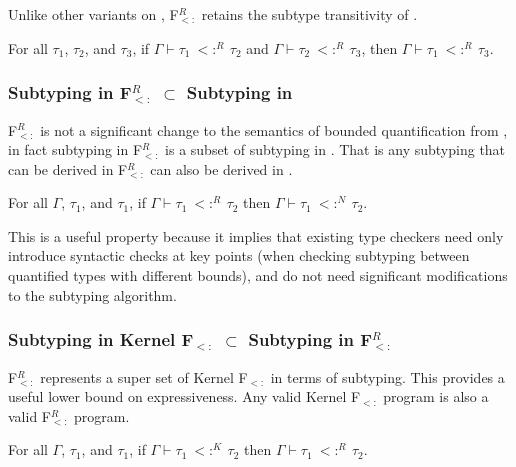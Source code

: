 \documentclass[runningheads]{llncs}
\begin{document}
Unlike other variants on \Fsub \cite{strong kernel sub}, F$_{<:}^R$ retains the subtype transitivity of
\Fsub.

\begin{theorem}
For all $\tau_1$, $\tau_2$, and $\tau_3$, if $\Gamma \vdash \tau_1\ <:^R\ \tau_2$ and $\Gamma \vdash \tau_2\ <:^R\ \tau_3$, then
$\Gamma \vdash \tau_1\ <:^R\ \tau_3$.
\end{theorem}

\subsubsection{Subtyping in F$_{<:}^R$ $\subset$ Subtyping in \Fsub}

F$_{<:}^R$ is not a significant change to the semantics of bounded quantification 
from \Fsub, in fact subtyping in F$_{<:}^R$ is a subset of subtyping in \Fsub. That 
is any subtyping that can be derived in F$_{<:}^R$ can also be derived in \Fsub.

\begin{theorem}
For all $\Gamma$, $\tau_1$, and $\tau_1$, if $\Gamma \vdash \tau_1\ <:^R\ \tau_2$ then 
$\Gamma \vdash \tau_1\ <:^N\ \tau_2$.
\end{theorem}

This is a useful property because it implies that existing type checkers need only 
introduce syntactic checks at key points (when checking subtyping between quantified types with different bounds), 
and do not need significant modifications
to the subtyping algorithm.

\subsubsection{Subtyping in Kernel F$_{<:}$ $\subset$ Subtyping in F$_{<:}^R$}

F$_{<:}^R$ represents a super set of Kernel F$_{<:}$ in terms of subtyping.
This provides a useful lower bound on expressiveness. Any valid Kernel F$_{<:}$ program 
is also a valid F$_{<:}^R$ program.

\begin{theorem}
For all $\Gamma$, $\tau_1$, and $\tau_1$, if $\Gamma \vdash \tau_1\ <:^K\ \tau_2$ then 
$\Gamma \vdash \tau_1\ <:^R\ \tau_2$.
\end{theorem}
\end{document}
